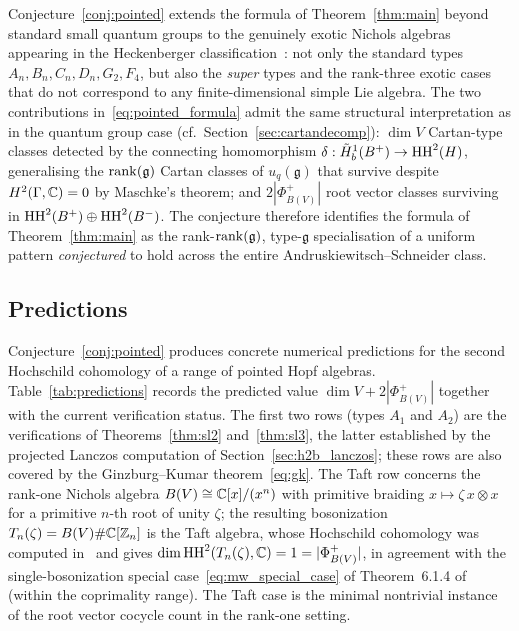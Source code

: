 Conjecture~\ref{conj:pointed} extends the formula of Theorem~\ref{thm:main} beyond standard small quantum groups to the genuinely exotic Nichols algebras appearing in the Heckenberger classification~\cite{Hec09,Ang09}: not only the standard types $A_n, B_n, C_n, D_n, G_2, F_4$, but also the \emph{super} types and the rank-three exotic cases that do not correspond to any finite-dimensional simple Lie algebra. The two contributions in~\eqref{eq:pointed_formula} admit the same structural interpretation as in the quantum group case (cf.\ Section~\ref{sec:cartandecomp}): $\dim V$ Cartan-type classes detected by the connecting homomorphism $\delta : \tilde{H}^1_b(B^{+}) \to \operatorname{HH}^2(H)$, generalising the $\operatorname{rank}(\mathfrak{g})$ Cartan classes of $u_q(\mathfrak{g})$ that survive despite $H^2(\Gamma, \mathbb{C}) = 0$ by Maschke's theorem; and $2|\Phi^+_{B(V)}|$ root vector classes surviving in $\operatorname{HH}^2(B^{+}) \oplus \operatorname{HH}^2(B^{-})$. The conjecture therefore identifies the formula of Theorem~\ref{thm:main} as the rank-$\operatorname{rank}(\mathfrak{g})$, type-$\mathfrak{g}$ specialisation of a uniform pattern \emph{conjectured} to hold across the entire Andruskiewitsch--Schneider class.

\subsection{Predictions}
\label{sec:predictions}

Conjecture~\ref{conj:pointed} produces concrete numerical predictions for the second Hochschild cohomology of a range of pointed Hopf algebras. Table~\ref{tab:predictions} records the predicted value $\dim V + 2|\Phi^+_{B(V)}|$ together with the current verification status. The first two rows (types $A_1$ and $A_2$) are the verifications of Theorems~\ref{thm:sl2} and~\ref{thm:sl3}, the latter established by the projected Lanczos computation of Section~\ref{sec:h2b_lanczos}; these rows are also covered by the Ginzburg--Kumar theorem~\eqref{eq:gk}. The Taft row concerns the rank-one Nichols algebra $B(V) \cong \mathbb{C}[x]/(x^n)$ with primitive braiding $x \mapsto \zeta\, x \otimes x$ for a primitive $n$-th root of unity $\zeta$; the resulting bosonization $T_n(\zeta) = B(V) \# \mathbb{C}[\mathbb{Z}_n]$ is the Taft algebra, whose Hochschild cohomology was computed in~\cite{MW08} and gives $\dim \operatorname{HH}^2(T_n(\zeta), \mathbb{C}) = 1 = |\Phi^+_{B(V)}|$, in agreement with the single-bosonization special case~\eqref{eq:mw_special_case} of Theorem~6.1.4 of~\cite{MW08} (within the coprimality range). The Taft case is the minimal nontrivial instance of the root vector cocycle count in the rank-one setting.

